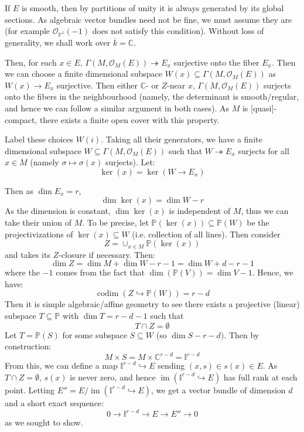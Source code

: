 \documentclass{book}
\newenvironment{Proof}[1][]
  {\begin{ProofTcb}[#1]}
  {\end{ProofTcb}}
\newcommand{\BI}{{\mathbb{I}}}
\newcommand{\C}{{\mathbb{C}}}
\renewcommand{\P}{{\mathbb{P}}}
\newcommand{\CO}{{\mathcal{O}}}
\newcommand{\sse}{\subseteq}
\newcommand{\im}{{\operatorname{im}}}
\newcommand{\codim}{{\operatorname{codim}}}
\begin{document}
\begin{Proof}
  If $E$ is smooth, then by partitions of unity it is always generated by its global sections. As algebraic
  vector bundles need not be fine, we must assume they are (for example $\CO_{\P^1}(-1)$ does not satisfy this
  condition). Without loss of generality, we shall work over $\overline{k} = \C$.

  Then, for each $x \in E$, $\Gamma(M, \CO_M(E)) \twoheadrightarrow E_x$ surjective onto the fiber $E_x$. Then
  we can choose a finite dimensional subspace $W(x) \sse \Gamma(M, \CO_M(E))$  as $W(x) \to E_x$ surjective. Then
  either $\C$- or $Z$-near $x$, $\Gamma(M, \CO_M(E))$ surjects onto the fibers in the neighbourhood (namely,
  the determinant is smooth/regular, and hence we can follow a similar argument in both cases). As $M$ is
  [quasi]-compact, there exists a finite open cover with this property.

  Label these choices $W(i)$. Taking all their generators, we have a finite dimensional subspace $W \sse
  \Gamma(M, \CO_M(E))$ such that $W \twoheadrightarrow E_x$ surjects for all $ x\in M$ (namely $\sigma \mapsto
  \sigma(x)$ surjects). Let:
  \[
    \ker(x) = \ker(W \to E_x)
  \]

  Then as $\dim E_x = r$,
  \[
    \dim \ker(x) = \dim W - r
  \]
  As the dimension is constant, $\dim\ker(x)$ is independent of $M$, thus we can take their union of $M$. To
  be precise, let $\P(\ker(x))\sse \P(W)$ be the projectivizations of $\ker(x) \sse W$ (i.e. collection of all
  lines). Then consider
  \[
    Z = \cup_{x \in M} \P(\ker(x))
  \]
  and takes its $Z$-closure if necessary. Then:
  \[
    \dim Z = \dim M + \dim W - r-1 = \dim W  + d-r-1
  \]
  where the $-1$ comes from the fact that $\dim(\P(V))  = \dim V - 1$. Hence, we have:
  \[
    \codim(Z \hookrightarrow \P(W)) = r-d
  \]
  Then it is simple algebraic/affine geometry to see there exists a projective (linear) subspace $T \sse \P$ with $\dim
  T = r-d-1$ such that
  \[
    T\cap Z = \emptyset
  \]
  Let $T = \P(S)$ for some subspace $S \sse W$ (so $\dim S - r-d)$. Then by construction:
  \[
    M\times S = M \times \C^{r-d} = \BI^{r-d}
  \]
  From this, we can define a map $\BI^{r-d} \hookrightarrow E$ sending $(x,s) \in s(x) \in E$. As $T\cap
  Z  = \emptyset$, $s(x)$ is never zero, and hence $\im(\BI^{r-d} \hookrightarrow E)$ has full rank at each
  point. Letting $E'' = E/\im(\BI^{r-d} \hookrightarrow E)$, we get a vector bundle of dimension $d$
  and a short exact sequence:
  \[
    0 \to \BI^{r-d} \to E \to E'' \to 0
  \]
  as we sought to show.
\end{Proof}
\end{document}

